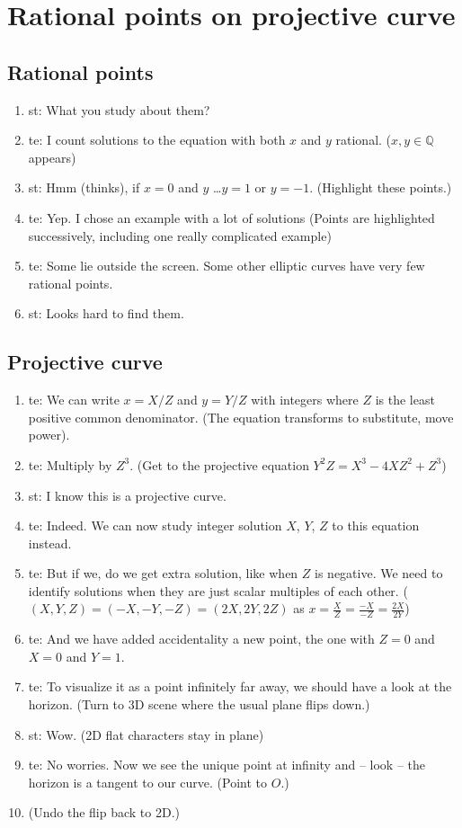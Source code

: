 \documentclass[a4paper]{article}
\newcommand{\QQ}{\mathbb{Q}}
\begin{document}
 \section{Rational points on projective curve}
 \subsection{Rational points}
 \begin{enumerate}
   \item st: What you study about them?
   \item te: I count solutions to the equation with both $x$ and $y$ rational. ($x,y\in\QQ$ appears)
   \item st: Hmm (thinks), if $x=0$ and $y$ \dots $y=1$ or $y=-1$. (Highlight these points.)
   \item te: Yep. I chose an example with a lot of solutions (Points are highlighted successively, including one really complicated example)
   \item te: Some lie outside the screen. Some other elliptic curves have very few rational points.
   \item st: Looks hard to find them.
 \end{enumerate}

 \subsection{Projective curve}
 \begin{enumerate}
   \item te: We can write $x=X/Z$ and $y=Y/Z$ with integers where $Z$ is the least positive common denominator. (The equation transforms to substitute, move power).
   \item te: Multiply by $Z^3$. (Get to the projective equation $Y^2Z= X^3-4XZ^2+Z^3$)
   \item st: I know this is a projective curve.
   \item te: Indeed. We can now study integer solution $X$, $Y$, $Z$ to this equation instead.
   \item te: But if we, do we get extra solution, like when $Z$ is negative.
   We need to identify solutions when they are just scalar multiples of each other. ($(X,Y,Z) = (-X,-Y,-Z) = (2X,2Y,2Z)$ as $x = \frac{X}{Z} = \frac{-X}{-Z} = \frac{2X}{2Y}$)
   \item te: And we have added accidentality a new point, the one with $Z=0$ and $X=0$ and $Y=1$.
   \item te:  To visualize it as a point infinitely far away, we should have a look at the horizon.
  (Turn to 3D scene where the usual plane flips down.)
   \item st: Wow. (2D flat characters stay in plane)
   \item te: No worries. Now we see the unique point at infinity and -- look -- the horizon is a tangent to our curve. (Point to $O$.)
   \item (Undo the flip back to 2D.)
 \end{enumerate}
\end{document}
